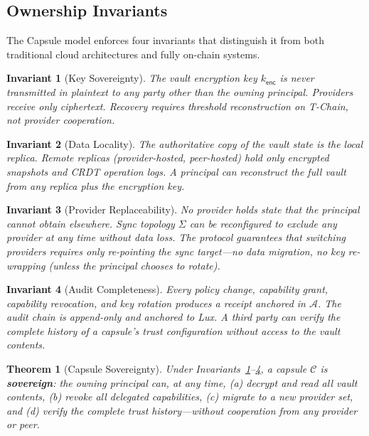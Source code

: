 \documentclass[11pt,a4paper]{article}
\newtheorem{theorem}{Theorem}[section]
\newtheorem{invariant}{Invariant}[section]
\begin{document}
\subsection{Ownership Invariants}

The Capsule model enforces four invariants that distinguish it from both
traditional cloud architectures and fully on-chain systems.

\begin{invariant}[Key Sovereignty]\label{inv:keys}
The vault encryption key $k_{\mathsf{enc}}$ is never transmitted in plaintext
to any party other than the owning principal. Providers receive only ciphertext.
Recovery requires threshold reconstruction on T-Chain, not provider cooperation.
\end{invariant}

\begin{invariant}[Data Locality]\label{inv:locality}
The authoritative copy of the vault state is the local replica. Remote replicas
(provider-hosted, peer-hosted) hold only encrypted snapshots and CRDT operation
logs. A principal can reconstruct the full vault from any replica plus the
encryption key.
\end{invariant}

\begin{invariant}[Provider Replaceability]\label{inv:provider}
No provider holds state that the principal cannot obtain elsewhere. Sync
topology $\Sigma$ can be reconfigured to exclude any provider at any time
without data loss. The protocol guarantees that switching providers requires
only re-pointing the sync target---no data migration, no key re-wrapping
(unless the principal chooses to rotate).
\end{invariant}

\begin{invariant}[Audit Completeness]\label{inv:audit}
Every policy change, capability grant, capability revocation, and key rotation
produces a receipt anchored in $\mathcal{A}$. The audit chain is append-only
and anchored to Lux. A third party can verify the complete history of a
capsule's trust configuration without access to the vault contents.
\end{invariant}

\begin{theorem}[Capsule Sovereignty]\label{thm:sovereignty}
Under Invariants~\ref{inv:keys}--\ref{inv:audit}, a capsule $\mathcal{C}$ is
\textbf{sovereign}: the owning principal can, at any time, (a) decrypt and read
all vault contents, (b) revoke all delegated capabilities, (c) migrate to a
new provider set, and (d) verify the complete trust history---without cooperation
from any provider or peer.
\end{theorem}
\end{document}
